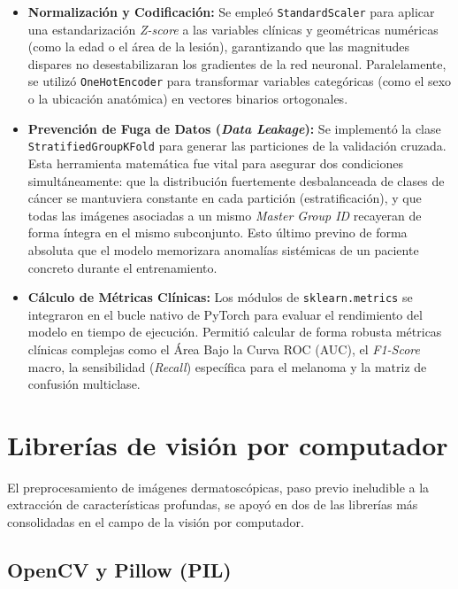 \begin{itemize}
	\item \textbf{Normalización y Codificación:} Se empleó \texttt{StandardScaler} para aplicar una estandarización \textit{Z-score} a las variables clínicas y geométricas numéricas (como la edad o el área de la lesión), garantizando que las magnitudes dispares no desestabilizaran los gradientes de la red neuronal. Paralelamente, se utilizó \texttt{OneHotEncoder} para transformar variables categóricas (como el sexo o la ubicación anatómica) en vectores binarios ortogonales.
	
	\item \textbf{Prevención de Fuga de Datos (\textit{Data Leakage}):} Se implementó la clase \texttt{StratifiedGroupKFold} para generar las particiones de la validación cruzada. Esta herramienta matemática fue vital para asegurar dos condiciones simultáneamente: que la distribución fuertemente desbalanceada de clases de cáncer se mantuviera constante en cada partición (estratificación), y que todas las imágenes asociadas a un mismo \textit{Master Group ID} recayeran de forma íntegra en el mismo subconjunto. Esto último previno de forma absoluta que el modelo memorizara anomalías sistémicas de un paciente concreto durante el entrenamiento.
	
	\item \textbf{Cálculo de Métricas Clínicas:} Los módulos de \texttt{sklearn.metrics} se integraron en el bucle nativo de PyTorch para evaluar el rendimiento del modelo en tiempo de ejecución. Permitió calcular de forma robusta métricas clínicas complejas como el Área Bajo la Curva ROC (AUC), el \textit{F1-Score} macro, la sensibilidad (\textit{Recall}) específica para el melanoma y la matriz de confusión multiclase.
\end{itemize}

\section{Librerías de visión por computador}

El preprocesamiento de imágenes dermatoscópicas, paso previo ineludible a la extracción de características profundas, se apoyó en dos de las librerías más consolidadas en el campo de la visión por computador.

\subsection{OpenCV y Pillow (PIL)}

